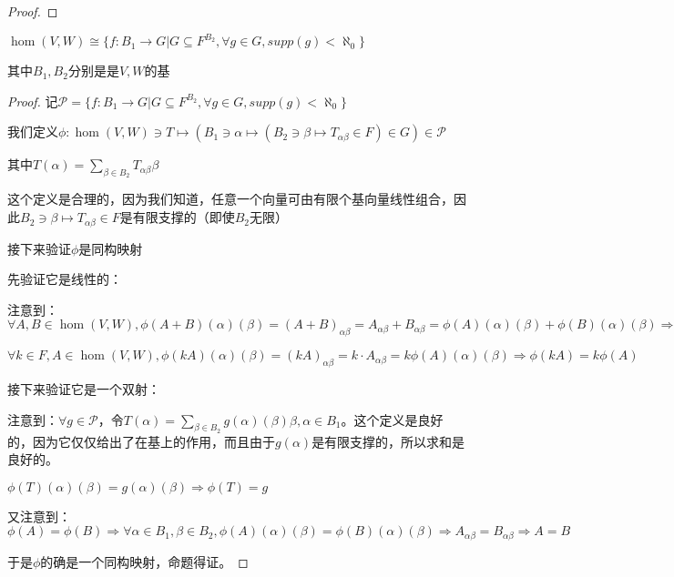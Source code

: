 \documentclass[12pt, a4paper, oneside, UTF8]{ctexbook}
\begin{document}
			\begin{proof}
				
			\end{proof}
			\begin{lemma}{}{}
				$\hom(V,W) \cong \{f:B_1 \to G|G \subseteq F^{B_2}, \forall g \in G,supp(g)<\aleph_0 \}$

				其中$B_1,B_2$分别是是$V,W$的基
			\end{lemma}
			\begin{proof}
				记$\mathcal{P} = \{f:B_1 \to G|G \subseteq F^{B_2}, \forall g \in G,supp(g)<\aleph_0 \}$

				我们定义$\phi : \hom (V,W) \ni T \mapsto \left(B_1 \ni \alpha \mapsto \left(B_2 \ni \beta \mapsto T_{\alpha \beta } \in F\right)\in G\right) \in \mathcal{P}$
			
				其中$T(\alpha )=\sum\limits_{\beta \in B_2} T_{\alpha \beta }\beta $

				这个定义是合理的，因为我们知道，任意一个向量可由有限个基向量线性组合，因此$B_2 \ni \beta \mapsto T_{\alpha \beta } \in F$是有限支撑的（即使$B_2$无限）

				接下来验证$\phi $是同构映射

				先验证它是线性的：

				注意到：$\forall A,B \in \hom(V,W),\phi (A+B)(\alpha )(\beta )=(A+B)_{\alpha \beta }=A_{\alpha \beta }+B_{\alpha \beta }=\phi (A)(\alpha )(\beta )+\phi (B)(\alpha )(\beta ) \Rightarrow \phi (A+B)=\phi (A)+\phi (B)$
			
				$\forall k \in F,A \in \hom(V,W),\phi (kA)(\alpha )(\beta )=(kA)_{\alpha \beta}=k\cdot A_{\alpha \beta }=k\phi (A)(\alpha )(\beta )\Rightarrow \phi (kA)=k\phi (A)$

				接下来验证它是一个双射：

				注意到：$\forall g \in \mathcal{P}$，令$T(\alpha )=\sum\limits_{\beta \in B_2} g(\alpha )(\beta )\beta,\alpha \in B_1$。这个定义是良好的，因为它仅仅给出了在基上的作用，而且由于$g(\alpha )$是有限支撑的，所以求和是良好的。

				$\phi (T)(\alpha )(\beta )=g(\alpha )(\beta ) \Rightarrow \phi (T)=g$

				又注意到：$\phi (A)=\phi (B) \Rightarrow \forall \alpha \in B_1,\beta \in B_2,\phi (A)(\alpha )(\beta )=\phi (B)(\alpha )(\beta ) \Rightarrow A_{\alpha \beta }=B_{\alpha \beta }\Rightarrow A=B$

				于是$\phi $的确是一个同构映射，命题得证。
			\end{proof}
\end{document}
